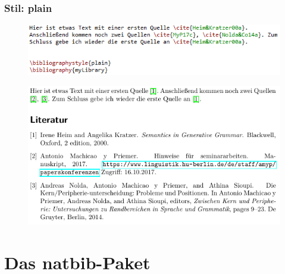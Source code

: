 \begin{frame}[fragile]
\frametitle{Stil: plain}

\begin{figure}
	\centering
	\includegraphics[width=.70\textwidth]{../../texfiles-beamer/tex-material/WissArb-latex/bib_plain_tex}
\end{figure}

\begin{figure}
	\centering
	\includegraphics[width=.70\textwidth]{../../texfiles-beamer/tex-material/WissArb-latex/bib_plain_pdf}
\end{figure}

\end{frame}


\section{Das natbib-Paket}

